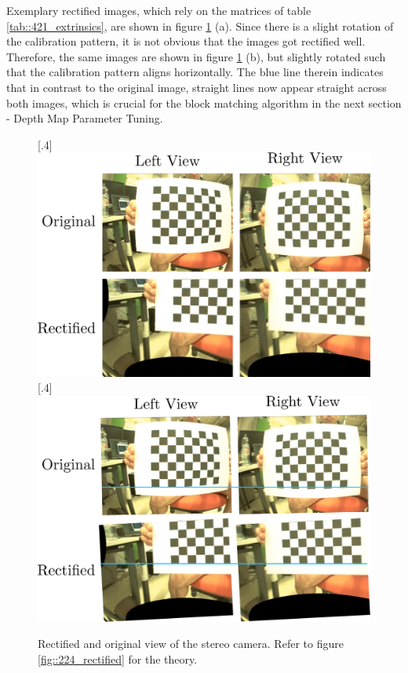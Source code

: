Exemplary rectified images, which rely on the matrices of table \ref{tab::421_extrinsics}, are shown in figure \ref{fig::421_rect} (a). Since there is a slight rotation of the calibration pattern, it is not obvious that the images got rectified well. Therefore, the same images are shown in figure \ref{fig::421_rect} (b), but slightly rotated such that the calibration pattern aligns horizontally. The blue line therein indicates that in contrast to the original image, straight lines now appear straight across both images, which is crucial for the block matching algorithm in the next section - Depth Map Parameter Tuning.
\begin{figure}[h!]
	\centering
	[.4\linewidth]{\includegraphics[scale=.25]{chapters/04_experiments/02_autonomous_walking/01_camera_calibration/rect.png}}
	[.4\linewidth]{\includegraphics[scale=.25]{chapters/04_experiments/02_autonomous_walking/01_camera_calibration/rect_line.png}}
	\caption{Rectified and original view of the stereo camera. Refer to figure \ref{fig::224_rectified} for the theory.}
	\label{fig::421_rect}
\end{figure}
